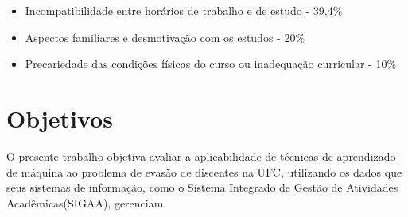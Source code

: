 \begin{itemize}
\item Incompatibilidade entre horários de trabalho e de estudo - 39,4\%
\item Aspectos familiares e desmotivação com os estudos - 20\%
\item Precariedade das condições físicas do curso ou inadequação curricular - 10\%
\end{itemize}

\section{Objetivos}
O presente trabalho objetiva avaliar a aplicabilidade de técnicas de aprendizado de máquina ao problema de evasão de discentes na UFC, utilizando os dados que seus sistemas de informação, como o Sistema Integrado de Gestão de Atividades Acadêmicas(SIGAA), gerenciam.